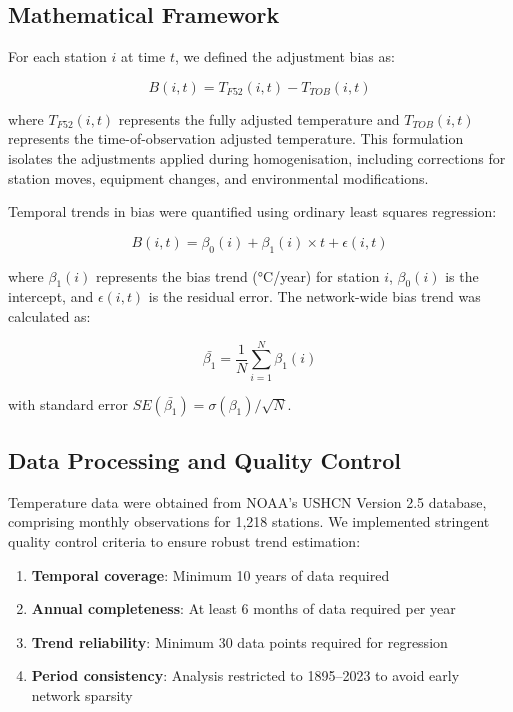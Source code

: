 \documentclass[11pt, a4paper]{article}
\begin{document}
\subsection{Mathematical Framework}

For each station $i$ at time $t$, we defined the adjustment bias as:

\begin{equation}
B(i,t) = T_{F52}(i,t) - T_{TOB}(i,t)
\end{equation}

where $T_{F52}(i,t)$ represents the fully adjusted temperature and $T_{TOB}(i,t)$ represents the time-of-observation adjusted temperature. This formulation isolates the adjustments applied during homogenisation, including corrections for station moves, equipment changes, and environmental modifications.

Temporal trends in bias were quantified using ordinary least squares regression:

\begin{equation}
B(i,t) = \beta_0(i) + \beta_1(i) \times t + \epsilon(i,t)
\end{equation}

where $\beta_1(i)$ represents the bias trend (°C/year) for station $i$, $\beta_0(i)$ is the intercept, and $\epsilon(i,t)$ is the residual error. The network-wide bias trend was calculated as:

\begin{equation}
\bar{\beta_1} = \frac{1}{N} \sum_{i=1}^{N} \beta_1(i)
\end{equation}

with standard error $SE(\bar{\beta_1}) = \sigma(\beta_1) / \sqrt{N}$.

\subsection{Data Processing and Quality Control}

Temperature data were obtained from NOAA's USHCN Version 2.5 database, comprising monthly observations for 1,218 stations. We implemented stringent quality control criteria to ensure robust trend estimation:

\begin{enumerate}
    \item \textbf{Temporal coverage}: Minimum 10 years of data required
    \item \textbf{Annual completeness}: At least 6 months of data required per year
    \item \textbf{Trend reliability}: Minimum 30 data points required for regression
    \item \textbf{Period consistency}: Analysis restricted to 1895–2023 to avoid early network sparsity
\end{enumerate}
\end{document}
